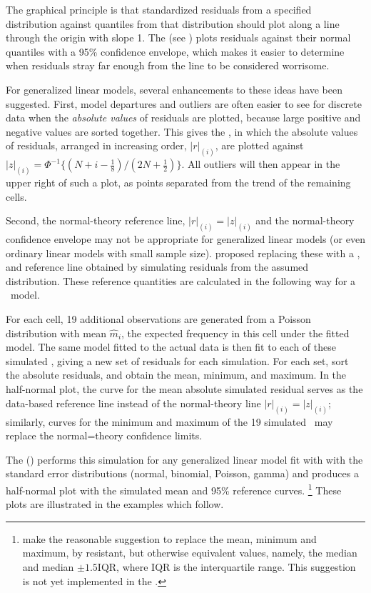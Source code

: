 The graphical principle is that standardized residuals from a specified
distribution against quantiles from that distribution
should plot along a line through the origin with slope 1.
The  (see ) plots residuals against their
normal quantiles with a 95\% confidence envelope,
which makes it easier to determine when residuals stray far enough from
the line to be considered worrisome.

For generalized linear models, several enhancements to these ideas
have been suggested.
First, model departures and outliers are often easier to see for
discrete data when the \emph{absolute values} of residuals are plotted,
because large positive and negative values are sorted together.
This gives the , in which the
absolute values of residuals,  arranged in increasing order, $|r|_{(i)}$,
are plotted
against
$|z|_{(i)} = \Phi^{-1} \{ (N+i-\frac{1}{8}) / (2N + \frac{1}{2}) \}$.
All outliers will then appear  in the upper right of such a plot,
as points separated from the trend of the remaining cells.

Second, the normal-theory reference line, $|r|_{(i)} = |z|_{(i)}$
and the normal-theory confidence envelope
may not be appropriate for generalized linear models
(or even ordinary linear models with small sample size).
\citet{Atkinson:81} proposed replacing these with a
, and reference line obtained by simulating residuals
from the assumed distribution.
These reference quantities are calculated in the following way for
a \loglin\ model.

For each cell, 19 additional observations are generated from a Poisson
distribution with mean $\widehat{m}_i$, the expected frequency in this cell
under the fitted model.
The same model fitted to the actual data is then fit to each of these
simulated \Dsets, giving a new set of residuals for each simulation.
For each set, sort the absolute residuals, and obtain the mean, minimum,
and maximum.
In the half-normal plot, the curve for the mean absolute simulated
residual serves as the data-based reference line instead of the normal-theory
line  $|r|_{(i)} = |z|_{(i)}$;
similarly, curves for the minimum and maximum of the 19 simulated
\Dsets\ may replace the normal=theory confidence limits.

The  () performs this simulation for
any generalized linear model fit with 
with the standard error distributions (normal, binomial, Poisson, gamma)
and produces a half-normal plot with the simulated mean and 95\%
reference curves.%
\footnote{\citet{FloresFlack:90} make the reasonable suggestion to replace the
mean, minimum and maximum, by resistant, but otherwise equivalent values,
namely, the median and median $\pm 1.5 \mbox{IQR}$, where IQR is the
interquartile range.
This suggestion is not yet implemented in the .}
These plots are illustrated in the examples which follow.

